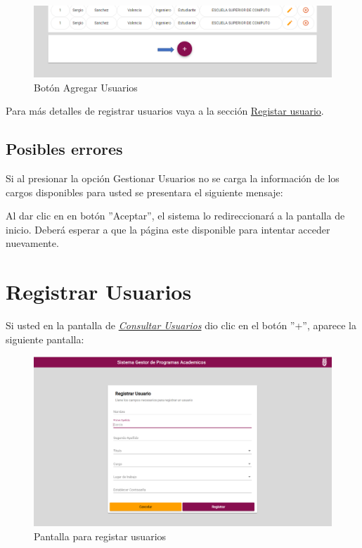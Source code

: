             \begin{figure}[!hbtp]
                \centering
                \hypertarget{add}{\includegraphics[width=0.7\linewidth]{images/SP5/BtnAgregar}}
                \caption{Botón Agregar Usuarios}
                \label{add}
            \end{figure}
    
            Para más detalles de registrar usuarios vaya a la sección \hyperref[registrarUs]{Registar usuario}.
            
        \subsection{Posibles errores}
    
            Si al  presionar la opción Gestionar Usuarios no se carga la información de los cargos disponibles para usted se presentara el siguiente mensaje:
            
            
            Al dar clic en en botón ''Aceptar'', el sistema  lo redireccionará  a la pantalla de inicio. Deberá esperar a que la página este disponible para intentar acceder nuevamente.
        

    \newpage
        
        \section{Registrar Usuarios} 
            Si usted  en la pantalla de \hyperlink{consultarUs}{\textit{Consultar Usuarios}} dio clic en el botón ''+'', aparece la siguiente pantalla:
            
            \begin{figure}[!hbtp]
                \centering
                \hypertarget{registrarUs}{\includegraphics[width=0.7\linewidth]{images/SP5/Registro-Usuario-vacio}}
                \caption{Pantalla para registar usuarios}
                \label{registrarrh}
            \end{figure}
            
